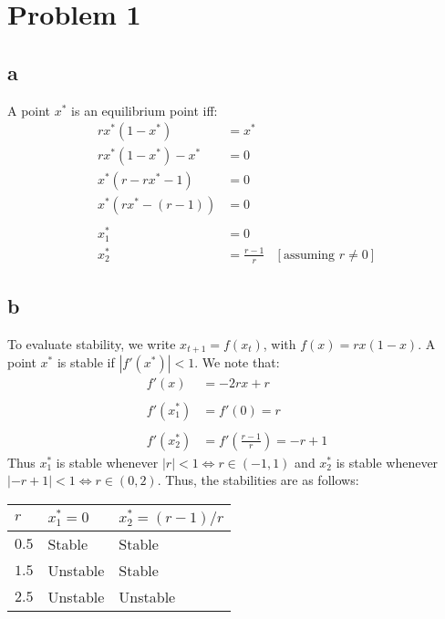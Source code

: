 \section*{Problem 1}
\subsection*{a}
A point \( x^* \) is an equilibrium point iff:
\begin{align*}
    r x^* (1 - x^*) &= x^* \\
    r x^* (1 - x^*) - x^* &= 0 \\
    x^* (r - r x^* - 1) &= 0 \\
    x^* (r x^* - (r - 1)) &= 0 \\
    \\
    x_{1}^{*} &= 0 \\
    x_{2}^{*} &= \frac{r - 1}{r} & [\mbox{assuming \(r \neq 0 \)}]
\end{align*}
\subsection*{b}
To evaluate stability, we write \( x_{t + 1} = f(x_{t}) \), with \( f(x) = r x (1 - x) \). A point \( x^{*} \) is stable if \( |f'(x^{*})| < 1 \). We note that:
\begin{align*}
    f'(x) &= - 2rx + r \\
    \\
    f'(x_{1}^{*}) &= f'(0) = r \\
    \\
    f'(x_{2}^{*}) &= f'\left(\frac{r - 1}{r}\right) = -r + 1
\end{align*}
Thus \( x_{1}^{*} \) is stable whenever \( |r| < 1 \iff r \in (-1, 1) \) and \( x_{2}^{*} \) is stable whenever \( |-r + 1| < 1 \iff r \in (0, 2) \). Thus, the stabilities are as follows:

\begin{table}[h]
    \centering
    \begin{tabular}{|l||l|l|}
        \hline
        \( r \) & \( x_{1}^{*} = 0 \) & \( x_{2}^{*} = (r - 1)/r \) \\
        \hline
        \( 0.5 \) & Stable & Stable \\
        \( 1.5 \) & Unstable & Stable \\
        \( 2.5 \) & Unstable & Unstable \\
        \hline
    \end{tabular}
\end{table}
